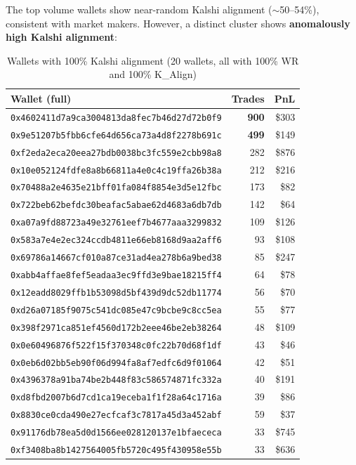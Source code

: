 \documentclass[11pt,a4paper]{article}
\begin{document}
The top volume wallets show near-random Kalshi alignment ($\sim$50--54\%), consistent with market makers. However, a distinct cluster shows \textbf{anomalously high Kalshi alignment}:

\begin{table}[H]
\centering
\caption{Wallets with 100\% Kalshi alignment (20 wallets, all with 100\% WR and 100\% K\_Align)}
\label{tab:kalshi_sync}
\footnotesize
\begin{tabular}{@{}lrr@{}}
\toprule
\textbf{Wallet (full)} & \textbf{Trades} & \textbf{PnL} \\
\midrule
\texttt{0x4602411d7a9ca3004813da8fec7b46d27d72b0f9} & \textbf{900} & \$303 \\
\texttt{0x9e51207b5fbb6cfe64d656ca73a4d8f2278b691c} & \textbf{499} & \$149 \\
\texttt{0xf2eda2eca20eea27bdb0038bc3fc559e2cbb98a8} & 282 & \$876 \\
\texttt{0x10e052124fdfe8a8b66811a4e0c4c19ffa26b38a} & 212 & \$216 \\
\texttt{0x70488a2e4635e21bff01fa084f8854e3d5e12fbc} & 173 & \$82 \\
\texttt{0x722beb62befdc30beafac5abae62d4683a6db7db} & 142 & \$64 \\
\texttt{0xa07a9fd88723a49e32761eef7b4677aaa3299832} & 109 & \$126 \\
\texttt{0x583a7e4e2ec324ccdb4811e66eb8168d9aa2aff6} & 93 & \$108 \\
\texttt{0x69786a14667cf010a87ce31ad4ea278b6a9bed38} & 85 & \$247 \\
\texttt{0xabb4affae8fef5eadaa3ec9ffd3e9bae18215ff4} & 64 & \$78 \\
\texttt{0x12eadd8029ffb1b53098d5bf439d9dc52db11774} & 56 & \$70 \\
\texttt{0xd26a07185f9075c541dc085e47c9bcbe9c8cc5ea} & 55 & \$77 \\
\texttt{0x398f2971ca851ef4560d172b2eee46be2eb38264} & 48 & \$109 \\
\texttt{0x0e60496876f522f15f370348c0fc22b70d68f1df} & 43 & \$46 \\
\texttt{0x0eb6d02bb5eb90f06d994fa8af7edfc6d9f01064} & 42 & \$51 \\
\texttt{0x4396378a91ba74be2b448f83c586574871fc332a} & 40 & \$191 \\
\texttt{0xd8fbd2007b6d7cd1ca19eceba1f1f28a64c1716a} & 39 & \$86 \\
\texttt{0x8830ce0cda490e27ecfcaf3c7817a45d3a452abf} & 59 & \$37 \\
\texttt{0x91176db78ea5d0d1566ee028120137e1bfaececa} & 33 & \$745 \\
\texttt{0xf3408ba8b1427564005fb5720c495f430958e55b} & 33 & \$636 \\
\bottomrule
\end{tabular}
\end{table}
\end{document}

